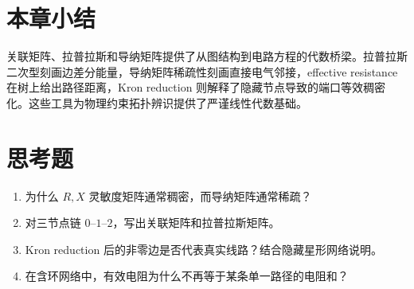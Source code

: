 \section{本章小结}

关联矩阵、拉普拉斯和导纳矩阵提供了从图结构到电路方程的代数桥梁。拉普拉斯二次型刻画边差分能量，导纳矩阵稀疏性刻画直接电气邻接，effective resistance 在树上给出路径距离，Kron reduction 则解释了隐藏节点导致的端口等效稠密化。这些工具为物理约束拓扑辨识提供了严谨线性代数基础。

\section*{思考题}
\begin{enumerate}
  \item 为什么 $R,X$ 灵敏度矩阵通常稠密，而导纳矩阵通常稀疏？
  \item 对三节点链 $0$--$1$--$2$，写出关联矩阵和拉普拉斯矩阵。
  \item Kron reduction 后的非零边是否代表真实线路？结合隐藏星形网络说明。
  \item 在含环网络中，有效电阻为什么不再等于某条单一路径的电阻和？
\end{enumerate}
